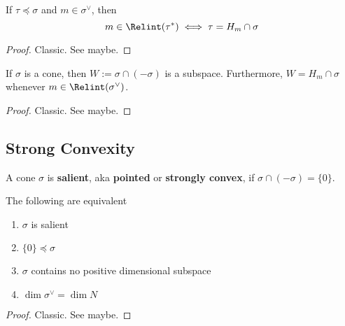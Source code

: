 \begin{lemma}
  \label{1-2-rel-interior-dual-face}

  If $\tau \preceq \sigma$ and $m \in \sigma^\vee$, then
  $$m \in \Relint(\tau^*) \iff \tau = H_m \cap \sigma$$
\end{lemma}
\begin{proof}
  \uses{}

  Classic. See \cite{Oda_1988} maybe.
\end{proof}


\begin{lemma}
  \label{1-2-min-face}

  If $\sigma$ is a cone, then $W := \sigma \cap (-\sigma)$ is a subspace. Furthermore,
  $W = H_m \cap \sigma$ whenever $m \in \Relint(\sigma^\vee)$.
\end{lemma}
\begin{proof}
  \uses{}

  Classic. See \cite{Oda_1988} maybe.
\end{proof}


\subsection{Strong Convexity}


\begin{definition}
  \label{1-2-12-salient-cone}
  \uses{}
  \leanok

  A cone $\sigma$ is {\bf salient}, aka {\bf pointed} or {\bf strongly convex}, if $\sigma \cap (-\sigma) = \{0\}$.
\end{definition}


\begin{proposition}
  \label{1-2-12-salient-cone-tfae}

  The following are equivalent
  \begin{enumerate}
    \item $\sigma$ is salient
    \item $\{0\} \preceq \sigma$
    \item $\sigma$ contains no positive dimensional subspace
    \item $\dim \sigma^\vee = \dim N$
  \end{enumerate}
\end{proposition}
\begin{proof}
  \uses{}

  Classic. See \cite{Oda_1988} maybe.
\end{proof}


